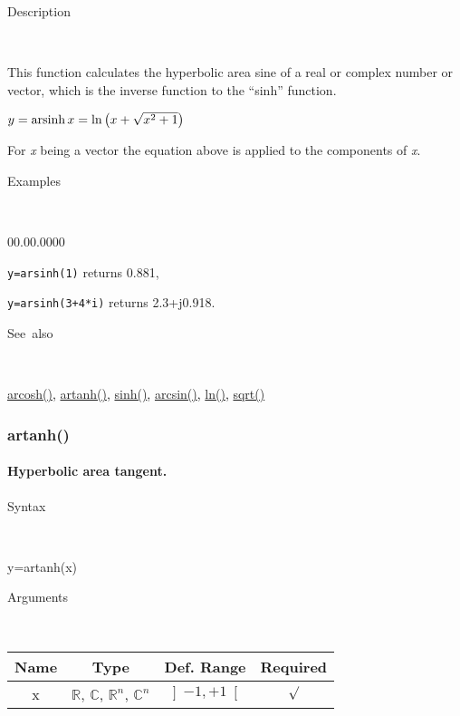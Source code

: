 \begin{description}
\item [Description]~
\end{description}
This function calculates the hyperbolic area sine of a real or complex
number or vector, which is the inverse function to the {}``sinh''
function.

\medskip{}
$y=\textrm{arsinh\,}x=\ln\left(x+\sqrt{x^{2}+1}\right)$ 
\medskip{}

For \textit{x} being a vector the equation above is applied
to the components of \textit{x}.

\begin{description}
\item [Examples]~
\end{description}
\begin{lyxlist}{00.00.0000}
\item [\texttt{y=arsinh(1)}]returns 0.881,
\item [\texttt{y=arsinh(3+4{*}i)}]returns 2.3+j0.918.
\end{lyxlist}
\begin{description}
\item [See~also]~
\end{description}
\textcolor{blue}{\hyperlink{arcosh}{arcosh()}}\textcolor{black}{,}
\textcolor{blue}{\hyperlink{artanh}{artanh()}}\textcolor{black}{,}
\textcolor{blue}{\hyperlink{sinh}{sinh()}}\textcolor{black}{,} \textcolor{blue}{\hyperlink{arcsin}{arcsin()}}\textcolor{black}{,}
\textcolor{blue}{\hyperlink{ln}{ln()}}\textcolor{black}{,} \textcolor{blue}{\hyperlink{sqrt}{sqrt()}}


\newpage
\subsubsection*{\hypertarget{artanh}{}{\Large artanh()}}


\paragraph{\label{par:Hyperbolic-area-tangent}Hyperbolic area tangent.}

\begin{description}
\item [Syntax]~
\end{description}
y=artanh(x)

\begin{description}
\item [Arguments]~
\end{description}
\begin{tabular}{|c|c|c|c|}
\hline 
Name&
Type&
Def. Range&
Required\tabularnewline
\hline
\hline 
x&
$\mathbb{R}$, $\mathbb{C}$, $\mathbb{R}^{n}$, $\mathbb{C}^{n}$&
$\left]-1,+1\right[$&
$\surd$\tabularnewline
\hline
\end{tabular}

